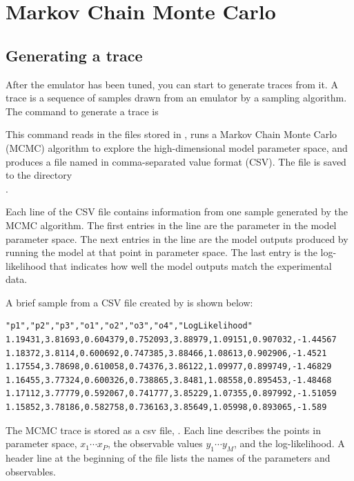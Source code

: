 \section{Markov Chain Monte Carlo}\label{sec:mcmc}

\subsection{Generating a trace}\label{subsec:GeneratingTheTrace}

After the emulator has been tuned, you can start to generate traces from it. A trace is a sequence of samples drawn from an emulator by a sampling algorithm. The command to generate a trace is


This command reads in the files stored in , runs a Markov Chain Monte Carlo (MCMC) algorithm to explore the high-dimensional model parameter space, and produces a file named  in comma-separated value format (CSV). The  file is saved to the directory \\.

Each line of the CSV file contains information from one sample generated by the MCMC algorithm. The first entries in the line are the parameter in the model parameter space. The next entries in the line are the model outputs produced by running the model at that point in parameter space. The last entry is the log-likelihood that indicates how well the model outputs match the experimental data.

A brief sample from a CSV file created by   is shown below:

\begin{verbatim}
"p1","p2","p3","o1","o2","o3","o4","LogLikelihood"
1.19431,3.81693,0.604379,0.752093,3.88979,1.09151,0.907032,-1.44567
1.18372,3.8114,0.600692,0.747385,3.88466,1.08613,0.902906,-1.4521
1.17554,3.78698,0.610058,0.74376,3.86122,1.09977,0.899749,-1.46829
1.16455,3.77324,0.600326,0.738865,3.8481,1.08558,0.895453,-1.48468
1.17112,3.77779,0.592067,0.741777,3.85229,1.07355,0.897992,-1.51059
1.15852,3.78186,0.582758,0.736163,3.85649,1.05998,0.893065,-1.589
\end{verbatim}

The MCMC trace is stored as a csv file, . Each line describes the points in parameter space, $x_1\cdots x_P$, the observable values $y_1\cdots y_M$, and the log-likelihood. A header line at the beginning of the file lists the names of the parameters and observables.

